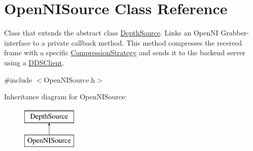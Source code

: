 \hypertarget{class_open_n_i_source}{\section{Open\+N\+I\+Source Class Reference}
\label{class_open_n_i_source}
}


Class that extends the abstract class \hyperlink{class_depth_source}{Depth\+Source}. Links an Open\+N\+I Grabber-\/interface to a private callback method. This method compresses the received frame with a specific \hyperlink{class_compression_strategy}{Compression\+Strategy} and sends it to the backend server using a \hyperlink{class_d_d_s_client}{D\+D\+S\+Client}.  




{\ttfamily \#include $<$Open\+N\+I\+Source.\+h$>$}

Inheritance diagram for Open\+N\+I\+Source\+:\begin{figure}[H]
\begin{center}
\leavevmode
\includegraphics[height=2.000000cm]{class_open_n_i_source}
\end{center}
\end{figure}
